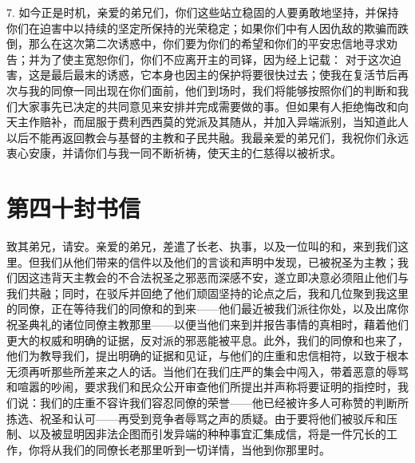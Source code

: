 7. 如今正是时机，亲爱的弟兄们，你们这些站立稳固的人要勇敢地坚持，并保持你们在迫害中以持续的坚定所保持的光荣稳定；如果你们中有人因仇敌的欺骗而跌倒，那么在这次第二次诱惑中，你们要为你们的希望和你们的平安忠信地寻求劝告；并为了使主宽恕你们，你们不应离开主的司铎，因为经上记载： 对于这次迫害，这是最后最末的诱惑，它本身也因主的保护将要很快过去；使我在复活节后再次与我的同僚一同出现在你们面前，他们到场时，我们将能够按照你们的判断和我们大家事先已决定的共同意见来安排并完成需要做的事。但如果有人拒绝悔改和向天主作赔补，而屈服于费利西西莫的党派及其随从，并加入异端派别，当知道此人以后不能再返回教会与基督的主教和子民共融。我最亲爱的弟兄们，我祝你们永远衷心安康，并请你们与我一同不断祈祷，使天主的仁慈得以被祈求。\par



\section{第四十封书信}

\par

\par

致其弟兄，请安。亲爱的弟兄，差遣了长老、执事，以及一位叫的和，来到我们这里。但我们从他们带来的信件以及他们的言谈和声明中发现，已被祝圣为主教；我们因这违背天主教会的不合法祝圣之邪恶而深感不安，遂立即决意必须阻止他们与我们共融；同时，在驳斥并回绝了他们顽固坚持的论点之后，我和几位聚到我这里的同僚，正在等待我们的同僚和的到来——他们最近被我们派往你处，以及出席你祝圣典礼的诸位同僚主教那里——以便当他们来到并报告事情的真相时，藉着他们更大的权威和明确的证据，反对派的邪恶能被平息。此外，我们的同僚和也来了，他们为教导我们，提出明确的证据和见证，与他们的庄重和忠信相符，以致于根本无须再听那些所差来之人的话。当他们在我们庄严的集会中闯入，带着恶意的辱骂和喧嚣的吵闹，要求我们和民众公开审查他们所提出并声称将要证明的指控时，我们说：我们的庄重不容许我们容忍同僚的荣誉——他已经被许多人可称赞的判断所拣选、祝圣和认可——再受到竞争者辱骂之声的质疑。由于要将他们被驳斥和压制、以及被显明因非法企图而引发异端的种种事宜汇集成信，将是一件冗长的工作，你将从我们的同僚长老那里听到一切详情，当他到你那里时。\par

